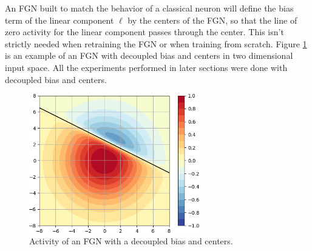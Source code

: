 \documentclass[12pt,oneside]{CUNY_PhD}
\begin{document}
An FGN built to match the behavior of a classical neuron will define the bias term of the linear component $\ell$ by the centers of the FGN, so that the line of zero activity for the linear component passes through the center. This isn't strictly needed when retraining the FGN or when training from scratch. Figure \ref{fig:decoupled} is an example of an FGN with decoupled bias and centers in two dimensional input space. All the experiments performed in later sections were done with decoupled bias and centers.
\begin{figure}[!t]
    \centering
    \includegraphics[width=0.66\textwidth]{images/2D-Decoupled/var-decoupled-center-activity-cropped.png}
    \caption{Activity of an FGN with a decoupled bias and centers.}
    \label{fig:decoupled}
\end{figure}
\end{document}
